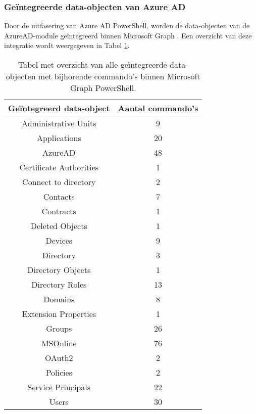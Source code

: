 \subsubsection{Geïntegreerde data-objecten van Azure AD}

Door de uitfasering van Azure \ac{AD} PowerShell, worden de data-objecten van de AzureAD-module geïntegreerd binnen Microsoft Graph \autocite{Microsoft2023l}. Een overzicht van deze integratie wordt weergegeven in Tabel \ref{MSGDOT}.

\begin{table}
    \small
    \centering
    \begin{tabular}{ |c|c| } 
        \hline
        \textbf{Geïntegreerd data-object} & \textbf{Aantal commando's} \\
        \hline
        Administrative Units & 9 \\ 
        Applications & 20 \\ 
        AzureAD & 48 \\ 
        Certificate Authorities & 1 \\ 
        Connect to directory & 2 \\ 
        Contacts & 7 \\ 
        Contracts & 1 \\ 
        Deleted Objects & 1 \\ 
        Devices & 9 \\    
        Directory & 3 \\
        Directory Objects & 1 \\ 
        Directory Roles & 13 \\ 
        Domains & 8 \\ 
        Extension Properties & 1 \\ 
        Groups & 26 \\
        MSOnline & 76 \\ 
        OAuth2 & 2 \\ 
        Policies & 2 \\ 
        Service Principals & 22 \\ 
        Users & 30 \\ 
        \hline
    \end{tabular}
    \caption[Tabel geïntegreerde data-objecten]{Tabel met overzicht van alle geïntegreerde data-objecten met bijhorende commando's binnen Microsoft Graph PowerShell.}
    \label{MSGDOT}
\end{table}

